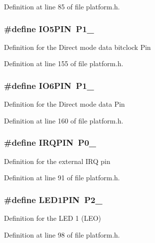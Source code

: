 Definition at line 85 of file platform.\-h.

\subsubsection[{I\-O5\-P\-I\-N}]{\setlength{\rightskip}{0pt plus 5cm}\#define I\-O5\-P\-I\-N~P1\-\_}\label{platform_8h_af2584caa41b0a6851dba98169a6edaa6}
Definition for the Direct mode data bitclock Pin 

Definition at line 155 of file platform.\-h.

\subsubsection[{I\-O6\-P\-I\-N}]{\setlength{\rightskip}{0pt plus 5cm}\#define I\-O6\-P\-I\-N~P1\-\_}\label{platform_8h_a6a776b13fcdfe2b027cd9d84f180a791}
Definition for the Direct mode data Pin 

Definition at line 160 of file platform.\-h.

\subsubsection[{I\-R\-Q\-P\-I\-N}]{\setlength{\rightskip}{0pt plus 5cm}\#define I\-R\-Q\-P\-I\-N~P0\-\_}\label{platform_8h_a02b244499426b898fdc751e44f688f19}
Definition for the external I\-R\-Q pin 

Definition at line 91 of file platform.\-h.

\subsubsection[{L\-E\-D1\-P\-I\-N}]{\setlength{\rightskip}{0pt plus 5cm}\#define L\-E\-D1\-P\-I\-N~P2\-\_}\label{platform_8h_a04d7aaffbb7b5afaf49acf8a3a39e33a}
Definition for the L\-E\-D 1 (L\-E\-O) 

Definition at line 98 of file platform.\-h.

